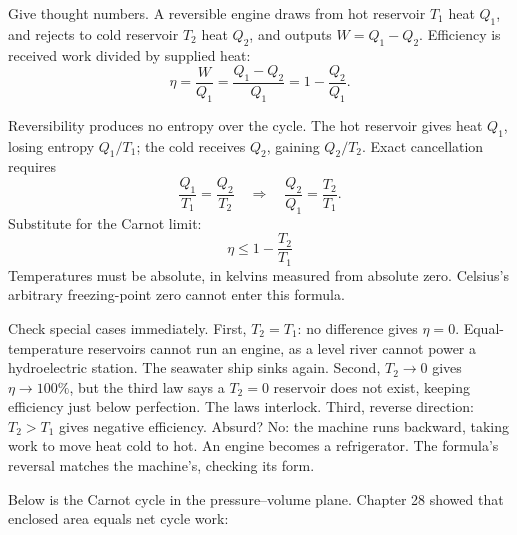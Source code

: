 
Give thought numbers. A reversible engine draws from hot reservoir \(T_1\) heat \(Q_1\), and rejects to cold reservoir \(T_2\) heat \(Q_2\), and outputs \(W=Q_1-Q_2\). Efficiency is received work divided by supplied heat:
\[
\eta=\frac{W}{Q_1}=\frac{Q_1-Q_2}{Q_1}=1-\frac{Q_2}{Q_1}.
\]

Reversibility produces no entropy over the cycle. The hot reservoir gives heat \(Q_1\), losing entropy \(Q_1/T_1\); the cold receives \(Q_2\), gaining \(Q_2/T_2\). Exact cancellation requires
\[
\frac{Q_1}{T_1}=\frac{Q_2}{T_2}
\quad\Longrightarrow\quad
\frac{Q_2}{Q_1}=\frac{T_2}{T_1}.
\]
Substitute for the Carnot limit:
\[
\boxed{\ \eta \leq 1-\frac{T_2}{T_1}\ }
\]
Temperatures must be absolute, in kelvins measured from absolute zero. Celsius's arbitrary freezing-point zero cannot enter this formula.

Check special cases immediately. First, \(T_2=T_1\): no difference gives \(\eta=0\). Equal-temperature reservoirs cannot run an engine, as a level river cannot power a hydroelectric station. The seawater ship sinks again. Second, \(T_2\to 0\) gives \(\eta\to 100\%\), but the third law says a \(T_2=0\) reservoir does not exist, keeping efficiency just below perfection. The laws interlock. Third, reverse direction: \(T_2>T_1\) gives negative efficiency. Absurd? No: the machine runs backward, taking work to move heat cold to hot. An engine becomes a refrigerator. The formula's reversal matches the machine's, checking its form.

Below is the Carnot cycle in the pressure--volume plane. Chapter 28 showed that enclosed area equals net cycle work:

\begin{center}
\end{center}

